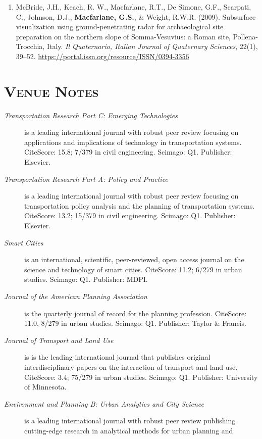 \documentclass[margin,line]{res}
\newif\ifdetail
\newcounter{enuminitialize}
\newenvironment{myenum}[1][]
{%
 \setcounter{enuminitialize}{#1}
 \addtocounter{enuminitialize}{2}
 \begin{enumerate}[left= 4pt, itemsep=8pt, start=\value{enuminitialize}, label=\arabic*\addtocounter{enumi}{-2}]
}
{%
 \end{enumerate}
}
\newcommand{\secfont}{\scshape }
\begin{document}
\begin{resume}
\begin{myenum}[28]
  \item McBride, J.H., Keach, R. W., Macfarlane, R.T., De Simone, G.F., Scarpati, C.,
Johnson, D.J., \textbf{Macfarlane, G.S.}, \& Weight, R.W.R. (2009). Subsurface visualization using
ground-penetrating radar for archaeological site preparation on the northern
slope of Somma-Vesuvius: a Roman site, Pollena-Trocchia, Italy. \textit{ Il Quaternario,
Italian Journal of Quaternary Sciences}, 22(1), 39–52. \url{https://portal.issn.org/resource/ISSN/0394-3356} \ifdetail Citations: 5  \fi
\end{myenum}

\ifdetail
\section{\secfont{Venue Notes}}
\begin{description}
  \item[\textit{Transportation Research Part C: Emerging Technologies}] is a
  leading international journal with robust peer review focusing on applications
  and implications of technology in transportation systems.
  CiteScore: 15.8; 7/379 in civil engineering. Scimago: Q1. Publisher: Elsevier.
  \item[\textit{Transportation Research Part A: Policy and Practice}] is
   a leading international journal with robust peer review focusing on
   transportation policy  analysis and the planning of transportation systems.
   CiteScore: 13.2; 15/379 in civil engineering. Scimago: Q1. Publisher: Elsevier.
  \item[\textit{Smart Cities}] is an international, scientific, peer-reviewed,
  open access journal on the science and technology of smart cities. CiteScore:
  11.2; 6/279 in urban studies. Scimago: Q1. Publisher: MDPI.
  \item[\textit{Journal of the American Planning Association}] is the quarterly
  journal of record for the planning profession. CiteScore: 11.0, 8/279 in urban studies. Scimago: Q1.
  Publisher: Taylor \& Francis.
  \item[\textit{Journal of Transport and Land Use}] is is the leading
  international journal that publishes original interdisciplinary papers on the
  interaction of transport and land use. CiteScore: 3.4; 75/279 in urban studies. Scimago: Q1. Publisher: University of Minnesota.
  \item[\textit{Environment and Planning B: Urban Analytics and City Science}]
  is a leading international journal with robust peer review publishing
  cutting-edge research in analytical methods for urban planning and

\end{description}
\end{resume}
\end{document}

